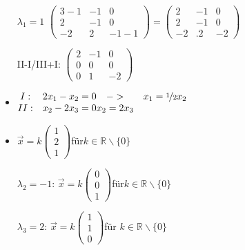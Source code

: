 \documentclass{article}
\newcommand{\R}{\mathbb{R}}
\begin{document}
\begin{itemize}
\begin{itemize}
\begin{itemize}
				\item[$\lambda_1=1$]{$\begin{pmatrix} 3-1 & -1 & 0 \\ 2 & -1 & 0 \\ -2 & 2 & -1-1 \end{pmatrix}=\begin{pmatrix} 2 & -1 & 0 \\ 2 & -1 & 0 \\ -2 &.2 & -2 \end{pmatrix}$}
				\item[II-I/III+I:]{$\begin{pmatrix} 2 & -1 & 0 \\ 0 & 0 & 0 \\ 0 & 1 & -2 \end{pmatrix}$}
				\item{$\begin{matrix} I: & 2x_1-x_2=0 \\ II: & x_2-2x_3=0 \end{matrix}\begin{matrix} -> & x_1=\nicefrac{1}{2}x_2 \\ x_2=2x_3 \end{matrix}$}
				\item{$\vec{x}=k \begin{pmatrix} 1 \\ 2 \\ 1 \end{pmatrix}$für$k\in\R\backslash\{0\}$}
				\item[$\lambda_2=-1$:]{$\vec{x}=k \begin{pmatrix} 0 \\ 0 \\ 1 \end{pmatrix}$für$k\in\R\backslash\{0\}$}
				\item[$\lambda_3=2$:]{$\vec{x}=k \begin{pmatrix} 1 \\ 1 \\ 0 \end{pmatrix}$für $k\in\R\backslash\{0\}$}
			\end{itemize}
		\end{itemize}
	\end{itemize}
\end{document}
